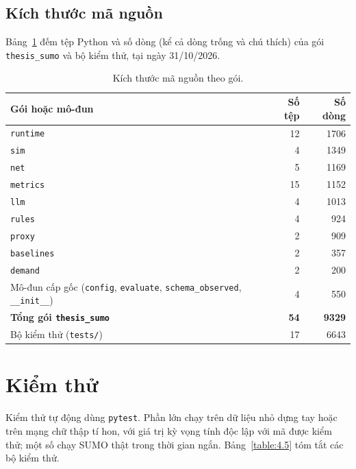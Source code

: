 \documentclass[../DoAn.tex]{subfiles}
\begin{document}
\subsection{Kích thước mã nguồn}

Bảng~\ref{table:4.size} đếm tệp Python và số dòng (kể cả dòng trống và chú thích) của gói \texttt{thesis\_sumo} và bộ kiểm thử, tại ngày 31/10/2026.

\begin{table}[H]
\centering
\small
\caption{Kích thước mã nguồn theo gói.}
\label{table:4.size}
\begin{tabular}{|l|r|r|}
\hline
\textbf{Gói hoặc mô-đun} & \textbf{Số tệp} & \textbf{Số dòng} \\ \hline
\texttt{runtime} & 12 & 1706 \\ \hline
\texttt{sim} & 4 & 1349 \\ \hline
\texttt{net} & 5 & 1169 \\ \hline
\texttt{metrics} & 15 & 1152 \\ \hline
\texttt{llm} & 4 & 1013 \\ \hline
\texttt{rules} & 4 & 924 \\ \hline
\texttt{proxy} & 2 & 909 \\ \hline
\texttt{baselines} & 2 & 357 \\ \hline
\texttt{demand} & 2 & 200 \\ \hline
Mô-đun cấp gốc (\texttt{config}, \texttt{evaluate}, \texttt{schema\_observed}, \texttt{\_\_init\_\_}) & 4 & 550 \\ \hline
\textbf{Tổng gói \texttt{thesis\_sumo}} & \textbf{54} & \textbf{9329} \\ \hline
Bộ kiểm thử (\texttt{tests/}) & 17 & 6643 \\ \hline
\end{tabular}
\end{table}

\section{Kiểm thử}
\label{section:testing}

Kiểm thử tự động dùng \texttt{pytest}. Phần lớn chạy trên dữ liệu nhỏ dựng tay hoặc trên mạng chữ thập tí hon, với giá trị kỳ vọng tính độc lập với mã được kiểm thử; một số chạy SUMO thật trong thời gian ngắn. Bảng~\ref{table:4.5} tóm tắt các bộ kiểm thử.
\end{document}
